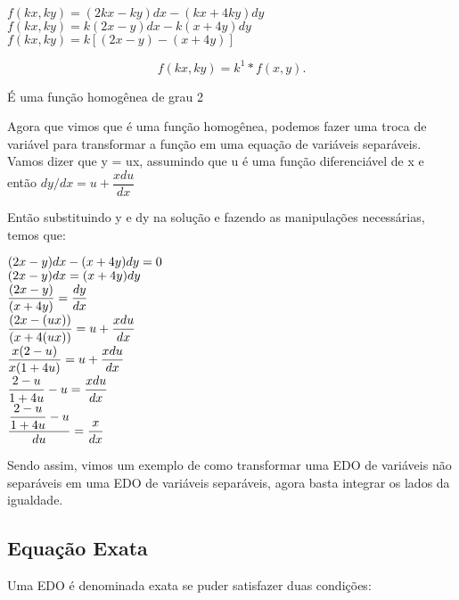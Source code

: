 \begin{center}
$ f(kx,ky) = (2kx - ky)dx  - (kx + 4ky)dy$ \\
$ f(kx,ky) = k(2x - y)dx - k(x + 4y)dy  $ \\
$ f(kx,ky) = k[(2x - y) - (x + 4y)] $ 
\end{center}
\begin{equation}
f(kx,ky) = k^1 * f(x,y).
\end{equation}

É uma função homogênea de grau 2

Agora que vimos que é uma função homogênea, podemos fazer uma troca de variável para transformar a função em uma equação de variáveis separáveis. Vamos dizer que y = ux, assumindo que u é uma função diferenciável de x e então $ dy/dx = u + \dfrac{xdu}{dx} $

Então substituindo y e dy na solução e fazendo as manipulações necessárias, temos que: 

\begin{center}
$
	(2x - y )dx - (x + 4y)dy = 0 \linebreak
$
\\
$
	(2x-y)dx = (x+4y)dy  \linebreak
$
\\
$
	\dfrac{(2x-y)}{(x+4y)} = \dfrac{dy}{dx}  \linebreak
$
\\
$
	\dfrac{(2x-(ux))}{(x+4(ux))} = u + \dfrac{xdu}{dx}   \linebreak
$
\\
$
	\dfrac{x(2-u)}{x(1+4u)} = u + \dfrac{xdu}{dx}   \linebreak
$
\\
$
	\dfrac{2-u}{1+4u} - u =  \dfrac{xdu}{dx}   \linebreak
$
\\
$
	\dfrac{\dfrac{2-u}{1+4u} - u}{du} =  \dfrac{x}{dx}   \linebreak
$
\end{center}

Sendo assim, vimos um exemplo de como transformar uma EDO de variáveis não separáveis em uma EDO de variáveis separáveis, agora basta integrar os lados da igualdade.


\subsection[Equação Exata]{Equação Exata}

Uma EDO é denominada exata se puder satisfazer duas condições: 

